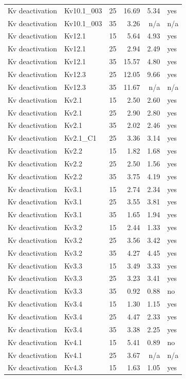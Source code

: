 \begin{longtable}{lllrrl}
Kv deactivation & Kv10.1\_003 & 25 & 16.69 & 5.34 & yes \\
Kv deactivation & Kv10.1\_003 & 35 & 3.26 & n/a & n/a \\
Kv deactivation & Kv12.1 & 15 & 5.64 & 4.93 & yes \\
Kv deactivation & Kv12.1 & 25 & 2.94 & 2.49 & yes \\
Kv deactivation & Kv12.1 & 35 & 15.57 & 4.80 & yes \\
Kv deactivation & Kv12.3 & 25 & 12.05 & 9.66 & yes \\
Kv deactivation & Kv12.3 & 35 & 11.67 & n/a & n/a \\
Kv deactivation & Kv2.1 & 15 & 2.50 & 2.60 & yes \\
Kv deactivation & Kv2.1 & 25 & 2.90 & 2.80 & yes \\
Kv deactivation & Kv2.1 & 35 & 2.02 & 2.46 & yes \\
Kv deactivation & Kv2.1\_C1 & 25 & 3.36 & 3.14 & yes \\
Kv deactivation & Kv2.2 & 15 & 1.82 & 1.68 & yes \\
Kv deactivation & Kv2.2 & 25 & 2.50 & 1.56 & yes \\
Kv deactivation & Kv2.2 & 35 & 3.75 & 4.19 & yes \\
Kv deactivation & Kv3.1 & 15 & 2.74 & 2.34 & yes \\
Kv deactivation & Kv3.1 & 25 & 3.55 & 3.81 & yes \\
Kv deactivation & Kv3.1 & 35 & 1.65 & 1.94 & yes \\
Kv deactivation & Kv3.2 & 15 & 2.44 & 1.33 & yes \\
Kv deactivation & Kv3.2 & 25 & 3.56 & 3.42 & yes \\
Kv deactivation & Kv3.2 & 35 & 4.27 & 4.45 & yes \\
Kv deactivation & Kv3.3 & 15 & 3.49 & 3.33 & yes \\
Kv deactivation & Kv3.3 & 25 & 3.23 & 3.41 & yes \\
Kv deactivation & Kv3.3 & 35 & 0.92 & 0.88 & no \\
Kv deactivation & Kv3.4 & 15 & 1.30 & 1.15 & yes \\
Kv deactivation & Kv3.4 & 25 & 4.47 & 2.33 & yes \\
Kv deactivation & Kv3.4 & 35 & 3.38 & 2.25 & yes \\
Kv deactivation & Kv4.1 & 15 & 5.41 & 0.89 & no \\
Kv deactivation & Kv4.1 & 25 & 3.67 & n/a & n/a \\
Kv deactivation & Kv4.3 & 15 & 1.63 & 1.05 & yes \\

\end{longtable}
